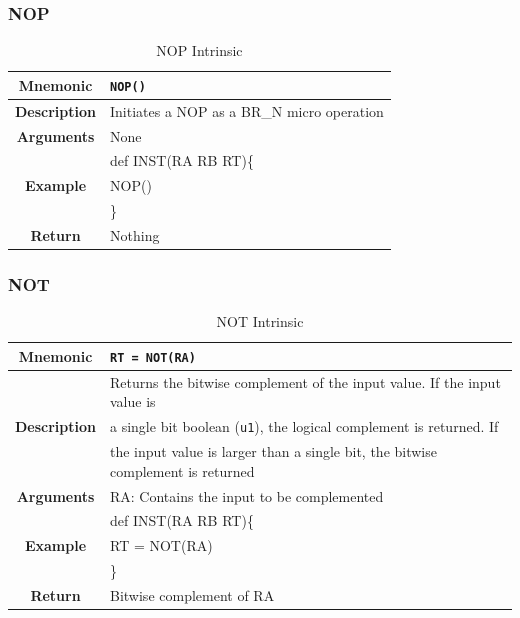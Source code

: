 \documentclass{article}
\begin{document}
\clearpage
\subsubsection{NOP}
\label{sec:NOP}

\begin{table}[h]
\begin{center}
\caption{NOP Intrinsic}
\vspace{0.125in}
\label{tab:NOPIntrinsic}
\begin{tabular}{|c|l|}
\hline
\textbf{Mnemonic} & \texttt{NOP()}\\
\hline

\textbf{Description} & Initiates a NOP as a BR\_N micro operation\\

\hline
\textbf{Arguments} & None\\
\hline
\multirow{3}{*}{\textbf{Example}} & def INST(RA RB RT)\{\\
                          			  &   NOP()\\
                                                    & \}\\
\hline
\textbf{Return} & Nothing\\
\hline
\end{tabular}
\end{center}
\end{table}

\clearpage
\subsubsection{NOT}
\label{sec:NOT}

\begin{table}[h]
\begin{center}
\caption{NOT Intrinsic}
\vspace{0.125in}
\label{tab:NOTIntrinsic}
\begin{tabular}{|c|l|}
\hline
\textbf{Mnemonic} & \texttt{RT = NOT(RA)}\\
\hline
\multirow{3}{*}{\textbf{Description}} & Returns the bitwise complement of the input value.  If the input value is \\
						      & a single bit boolean (\texttt{u1}), the logical complement is returned.  If \\
						      & the input value is larger than a single bit, the bitwise complement is returned\\
\hline
\textbf{Arguments} & RA: Contains the input to be complemented\\
\hline
\multirow{3}{*}{\textbf{Example}} & def INST(RA RB RT)\{\\
                          			  &   RT = NOT(RA)\\
                                                    & \}\\
\hline
\textbf{Return} & Bitwise complement of RA\\                                                    
\hline
\end{tabular}
\end{center}
\end{table}
\end{document}
